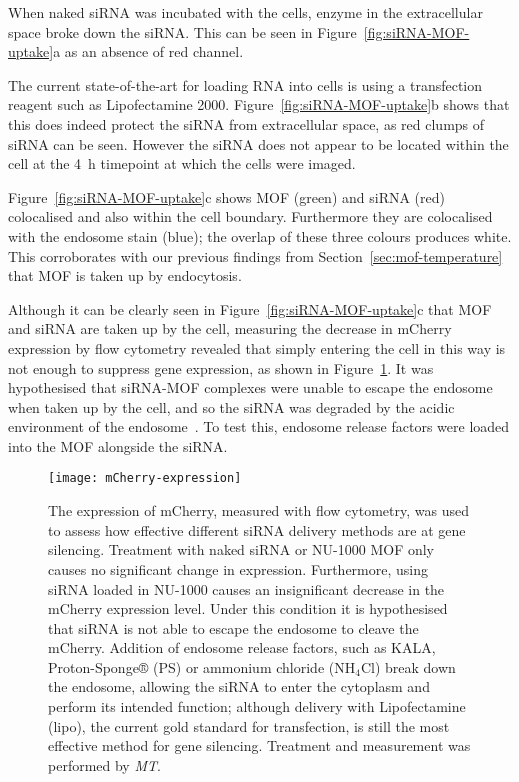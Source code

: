 When naked siRNA was incubated with the cells, enzyme in the extracellular space broke down the siRNA.
This can be seen in Figure~\ref{fig:siRNA-MOF-uptake}a as an absence of red channel.

The current state-of-the-art for loading RNA into cells is using a transfection reagent such as Lipofectamine 2000.
Figure~\ref{fig:siRNA-MOF-uptake}b shows that this does indeed protect the siRNA from extracellular space, as red clumps of siRNA can be seen.
However the siRNA does not appear to be located within the cell at the \SI{4}{\hour} timepoint at which the cells were imaged.

Figure~\ref{fig:siRNA-MOF-uptake}c shows MOF (green) and siRNA (red) colocalised and also within the cell boundary.
Furthermore they are colocalised with the endosome stain (blue); the overlap of these three colours produces white.
This corroborates with our previous findings from Section~\ref{sec:mof-temperature} that MOF is taken up by endocytosis.

Although it can be clearly seen in Figure~\ref{fig:siRNA-MOF-uptake}c that MOF and siRNA are taken up by the cell, measuring the decrease in mCherry expression by flow cytometry revealed that simply entering the cell in this way is not enough to suppress gene expression, as shown in Figure~\ref{fig:mCherry-expression}.
It was hypothesised that siRNA-MOF complexes were unable to escape the endosome when taken up by the cell, and so the siRNA was degraded by the acidic environment of the endosome~\cite{geisow1984ph}.
To test this, endosome release factors were loaded into the MOF alongside the siRNA.

\begin{figure}[htbp!]
\centering
\texttt{[image: mCherry-expression]}
\caption[MOFs: siRNA suppresses mCherry expression when an endosome release factor is loaded to MOFs]{ The expression of mCherry, measured with flow cytometry, was used to assess how effective different siRNA delivery methods are at gene silencing. Treatment with naked siRNA or NU-1000 MOF only causes no significant change in expression. Furthermore, using siRNA loaded in NU-1000 causes an insignificant decrease in the mCherry expression level. Under this condition it is hypothesised that siRNA is not able to escape the endosome to cleave the mCherry. Addition of endosome release factors, such as KALA, Proton-Sponge® (PS) or ammonium chloride ($\text{NH}_{\text{4}}\text{Cl}$) break down the endosome, allowing the siRNA to enter the cytoplasm and perform its intended function; although delivery with Lipofectamine (lipo), the current gold standard for transfection, is still the most effective method for gene silencing. Treatment and measurement was performed by \textit{MT}. }
\label{fig:mCherry-expression}
\end{figure}

